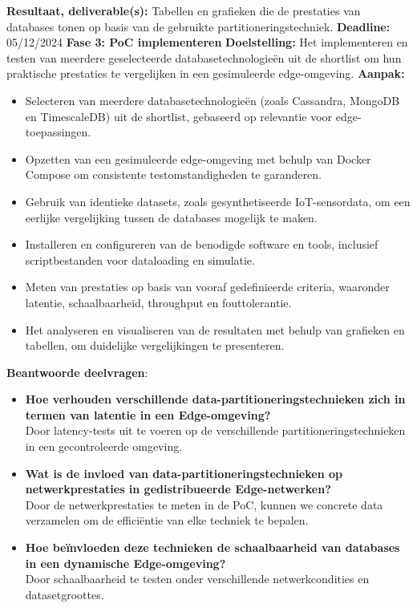     \textbf{Resultaat, deliverable(s):} Tabellen en grafieken die de prestaties van databases tonen op basis van de gebruikte partitioneringstechniek.\newline\newline
    \textbf{Deadline:} 05/12/2024\newline\newline
\textbf{Fase 3: PoC implementeren}\newline\newline
\textbf{Doelstelling:} Het implementeren en testen van meerdere geselecteerde databasetechnologieën uit de shortlist om hun praktische prestaties te vergelijken in een gesimuleerde edge-omgeving.\newline\newline
\textbf{Aanpak:}
    \begin{itemize}
        \item Selecteren van meerdere databasetechnologieën (zoals Cassandra, MongoDB en TimescaleDB) uit de shortlist, gebaseerd op relevantie voor edge-toepassingen.
        \item Opzetten van een gesimuleerde edge-omgeving met behulp van Docker Compose om consistente testomstandigheden te garanderen.
        \item Gebruik van identieke datasets, zoals gesynthetiseerde IoT-sensordata, om een eerlijke vergelijking tussen de databases mogelijk te maken.
        \item Installeren en configureren van de benodigde software en tools, inclusief scriptbestanden voor dataloading en simulatie.
        \item Meten van prestaties op basis van vooraf gedefinieerde criteria, waaronder latentie, schaalbaarheid, throughput en fouttolerantie.
        \item Het analyseren en visualiseren van de resultaten met behulp van grafieken en tabellen, om duidelijke vergelijkingen te presenteren.
    \end{itemize}
    \textbf{Beantwoorde deelvragen}:
    \begin{itemize}
    \item \textbf{Hoe verhouden verschillende data-partitioneringstechnieken zich in termen van latentie in een Edge-omgeving?} \\
      Door latency-tests uit te voeren op de verschillende partitioneringstechnieken in een gecontroleerde omgeving.
    \item \textbf{Wat is de invloed van data-partitioneringstechnieken op netwerkprestaties in gedistribueerde Edge-netwerken?} \\
      Door de netwerkprestaties te meten in de PoC, kunnen we concrete data verzamelen om de efficiëntie van elke techniek te bepalen.
    \item \textbf{Hoe beïnvloeden deze technieken de schaalbaarheid van databases in een dynamische Edge-omgeving?} \\
      Door schaalbaarheid te testen onder verschillende netwerkcondities en datasetgroottes.
    \end{itemize}
